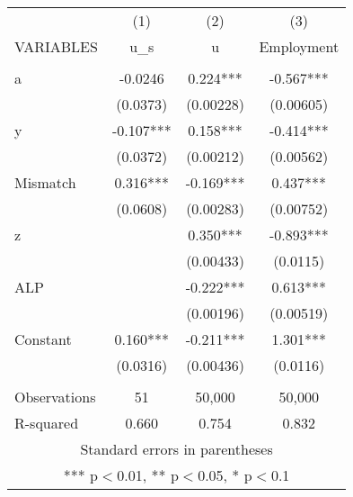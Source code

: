 \documentclass[]{article}
\begin{document}
\begin{tabular}{lccc} \hline
 & (1) & (2) & (3) \\
VARIABLES & u\_s & u & Employment \\ \hline
 &  &  &  \\
a & -0.0246 & 0.224*** & -0.567*** \\
 & (0.0373) & (0.00228) & (0.00605) \\
y & -0.107*** & 0.158*** & -0.414*** \\
 & (0.0372) & (0.00212) & (0.00562) \\
Mismatch & 0.316*** & -0.169*** & 0.437*** \\
 & (0.0608) & (0.00283) & (0.00752) \\
z &  & 0.350*** & -0.893*** \\
 &  & (0.00433) & (0.0115) \\
ALP &  & -0.222*** & 0.613*** \\
 &  & (0.00196) & (0.00519) \\
Constant & 0.160*** & -0.211*** & 1.301*** \\
 & (0.0316) & (0.00436) & (0.0116) \\
 &  &  &  \\
Observations & 51 & 50,000 & 50,000 \\
 R-squared & 0.660 & 0.754 & 0.832 \\ \hline
\multicolumn{4}{c}{ Standard errors in parentheses} \\
\multicolumn{4}{c}{ *** p$<$0.01, ** p$<$0.05, * p$<$0.1} \\
\end{tabular}
\end{document}
